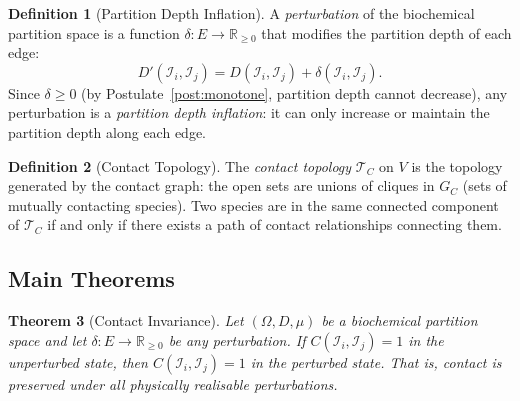 \documentclass[11pt,twocolumn]{article}
\theoremstyle{plain}
\newtheorem{theorem}{Theorem}[section]
\theoremstyle{definition}
\newtheorem{definition}[theorem]{Definition}
\newcommand{\reals}{\mathbb{R}}
\begin{document}
\begin{definition}[Partition Depth Inflation]
\label{def:inflation}
A \emph{perturbation} of the biochemical partition space is a function
$\delta: E \to \reals_{\geq 0}$ that modifies the partition depth of each edge:
\[
  D'(\mathcal{I}_i, \mathcal{I}_j)
  = D(\mathcal{I}_i, \mathcal{I}_j) + \delta(\mathcal{I}_i, \mathcal{I}_j).
\]
Since $\delta \geq 0$ (by Postulate~\ref{post:monotone}, partition depth cannot
decrease), any perturbation is a \emph{partition depth inflation}: it can only
increase or maintain the partition depth along each edge.
\end{definition}

\begin{definition}[Contact Topology]
\label{def:contact_topology}
The \emph{contact topology} $\mathcal{T}_C$ on $V$ is the topology generated by
the contact graph: the open sets are unions of cliques in $G_C$ (sets of
mutually contacting species). Two species are in the same connected component
of $\mathcal{T}_C$ if and only if there exists a path of contact relationships
connecting them.
\end{definition}

\subsection{Main Theorems}

\begin{theorem}[Contact Invariance]
\label{thm:contact_invariance}
Let $(\Omega, D, \mu)$ be a biochemical partition space and let $\delta: E \to
\reals_{\geq 0}$ be any perturbation. If $C(\mathcal{I}_i, \mathcal{I}_j) = 1$
in the unperturbed state, then $C(\mathcal{I}_i, \mathcal{I}_j) = 1$ in the
perturbed state. That is, contact is preserved under all physically realisable
perturbations.
\end{theorem}
\end{document}
